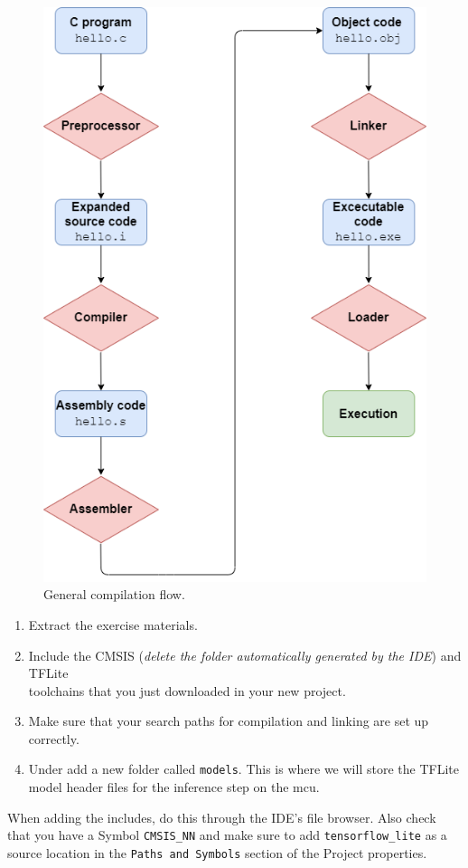 \documentclass[parskip=half,notes,cadrem,toolver]{iisvlsi}
\begin{document}
\begin{figure}[H]
    \begin{center}
        \includegraphics[width=0.5\linewidth]{figures/mlonmcu_compile.png}
        \caption[General compilation flow.]{General compilation flow.}
        \label{fig:comp}
    \end{center}
\end{figure}

\begin{studtask}
    \begin{enumerate}
        \item Extract the exercise materials. 
        \item Include the CMSIS (\textit{delete the folder automatically generated by the IDE}) and TFLite \\ toolchains that you just downloaded in your new project. 
        \item Make sure that your search paths for compilation and linking are set up correctly. 
        \item Under  add a new folder called \texttt{models}. This is where we will store the TFLite model header files for the inference step on the \gls{mcu}. 
    \end{enumerate}
\end{studtask}

\begin{note*}
    When adding the includes, do this through the IDE's file browser. Also check that you have a Symbol \texttt{CMSIS\_NN} and make sure to add \texttt{tensorflow\_lite} as a source location in the \texttt{Paths and Symbols} section of the Project properties.
\end{note*}
\end{document}
